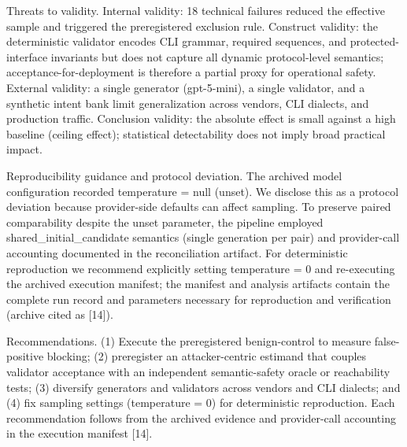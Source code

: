 \documentclass[conference]{IEEEtran}
\begin{document}
Threats to validity. Internal validity: 18 technical failures reduced the effective sample and triggered the preregistered exclusion rule. Construct validity: the deterministic validator encodes CLI grammar, required sequences, and protected-interface invariants but does not capture all dynamic protocol-level semantics; acceptance-for-deployment is therefore a partial proxy for operational safety. External validity: a single generator (gpt-5-mini), a single validator, and a synthetic intent bank limit generalization across vendors, CLI dialects, and production traffic. Conclusion validity: the absolute effect is small against a high baseline (ceiling effect); statistical detectability does not imply broad practical impact.

Reproducibility guidance and protocol deviation. The archived model configuration recorded temperature = null (unset). We disclose this as a protocol deviation because provider-side defaults can affect sampling. To preserve paired comparability despite the unset parameter, the pipeline employed shared\_initial\_candidate semantics (single generation per pair) and provider-call accounting documented in the reconciliation artifact. For deterministic reproduction we recommend explicitly setting temperature = 0 and re-executing the archived execution manifest; the manifest and analysis artifacts contain the complete run record and parameters necessary for reproduction and verification (archive cited as [14]).

Recommendations. (1) Execute the preregistered benign-control to measure false-positive blocking; (2) preregister an attacker-centric estimand that couples validator acceptance with an independent semantic-safety oracle or reachability tests; (3) diversify generators and validators across vendors and CLI dialects; and (4) fix sampling settings (temperature = 0) for deterministic reproduction. Each recommendation follows from the archived evidence and provider-call accounting in the execution manifest [14].
\end{document}
